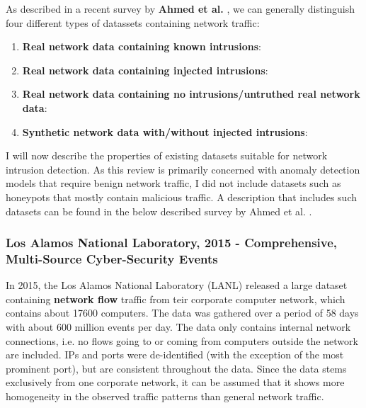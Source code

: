As described in a recent survey by \textbf{Ahmed et al.} \cite{ahmed2016survey}, we can generally distinguish four different types of datassets containing network traffic:

\begin{enumerate}

\item \textbf{Real network data containing known intrusions}: 

\item \textbf{Real network data containing injected intrusions}:

\item \textbf{Real network data containing no intrusions/untruthed real network data}:

\item \textbf{Synthetic network data with/without injected intrusions}:

\end{enumerate}

I will now describe the properties of existing datasets suitable for network intrusion detection. As this review is primarily concerned with anomaly detection models that require benign network traffic, I did not include datasets such as honeypots that mostly contain malicious traffic. A description that includes such datasets can be found in the below described survey by Ahmed et al. \cite{ahmed2016survey}.



\subsubsection*{Los Alamos National Laboratory, 2015 - Comprehensive, Multi-Source Cyber-Security Events \cite{akent-2015-enterprise-data}\cite{kent-2015-cyberdata1}}

In 2015, the Los Alamos National Laboratory (LANL) released a large dataset containing \textbf{network flow} traffic from teir corporate computer network, which contains about 17600 computers. The data was gathered over a period of 58 days with about 600 million events per day. The data only contains internal network connections, i.e. no flows going to or coming from computers outside the network are included. IPs and ports were de-identified (with the exception of the most prominent port), but are consistent throughout the data. Since the data stems exclusively from one corporate network, it can be assumed that it shows more homogeneity in the observed traffic patterns than  general network traffic.

